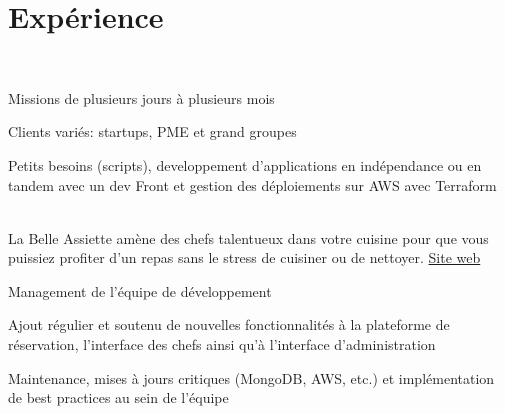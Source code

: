 \documentclass[
  french,
  a4paper
]{resume-openfont}
\begin{document}
\begin{minipage}[t]{0.66\textwidth}


\section{Expérience}

%
%
\\
\vspace{0.5\topsep}
\begin{tightemize}
\item Missions de plusieurs jours à plusieurs mois
\item Clients variés: startups, PME et grand groupes
\item Petits besoins (scripts), developpement d'applications en indépendance ou en tandem avec un dev Front et gestion des déploiements sur AWS avec Terraform
\end{tightemize}
\sectionsep

%
%
\\
La Belle Assiette amène des chefs talentueux dans votre cuisine pour que vous puissiez profiter d'un repas sans le stress de cuisiner ou de nettoyer. \href{https://labelleassiette.fr}{Site web}
\vspace{\topsep}
\begin{tightemize}
\item Management de l'équipe de développement
\item Ajout régulier et soutenu de nouvelles fonctionnalités à la plateforme de réservation, l'interface des chefs ainsi qu'à l'interface d'administration
\item Maintenance, mises à jours critiques (MongoDB, AWS, etc.) et implémentation de best practices au sein de l'équipe
\end{tightemize}
\sectionsep


\end{minipage}
\end{document}
